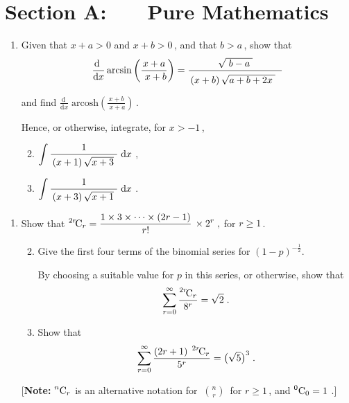 \documentclass[a4, 11pt]{report}
\newlength{\qspace}
\newcounter{qnumber}
\newenvironment{question}%
 {\vspace{\qspace}
  \begin{enumerate}[\bfseries 1\quad][10]%
    \setcounter{enumi}{\value{qnumber}}%
    \item%
 }
{
  \end{enumerate}
  \filbreak
  \stepcounter{qnumber}
 }
\newenvironment{questionparts}[1][1]%
 {
  \begin{enumerate}[\bfseries (i)]%
    \setcounter{enumii}{#1}
    \addtocounter{enumii}{-1}
    \setlength{\itemsep}{5mm}
    \setlength{\parskip}{8pt}
 }
 {
  \end{enumerate}
 }
\def\d{{\mathrm d}}
\def\A{{\mathrm A}}
\def\ge{\geqslant}
\newcommand{\ds}{\displaystyle}
\def\l{\left(}
\def\r{\right)}
\begin{document}
\setcounter{page}{2}

 
\section*{Section A: \ \ \ Pure Mathematics}

\begin{question}
Given that $x+a>0$ and $x+b>0\,$, and that $b>a\,$, show that   
\[  
\frac{\mathrm{d} \ }{\mathrm{d} x}   
\arcsin \l \frac{x + a }{ \ x + b} \r =   
\frac{ \sqrt{\;b - a\;}} {\vphantom{\Big(} \l x + b \r \sqrt{ a + b + 2x\;} \ \ }  
\]  
and find $\displaystyle   
\frac{\mathrm{d} \ }{  \mathrm{d} x} \;  \mathrm{arcosh} \l \frac{x + b }{ \ x + a} \r \,$.  
  
Hence, or otherwise, integrate, for $x > -1\,$,  
\begin{questionparts}  
\item $\displaystyle \int
\frac{1}{ \vphantom{\dot (}\l x + 1 \r \sqrt{x + 3} \ } \; \mathrm{d} x\;$,  
\item $\displaystyle \int
\frac{1} {\vphantom{\dot (}\l x + 3 \r \sqrt{x + 1} \ } \; \mathrm{d} x\;$.  
\end{questionparts}  
  
\noindent[You may use the results \  
$\ds \frac{\d \ }{\d x} \arcsin x = \frac 1 {\sqrt{1-x^2\;}\;}$  
\ and \   
$\ds \frac{\d \ }{\d x} \; {\rm arcosh } \; x = \frac 1 {\sqrt{x^2-1}\;}\;$. \ ]  
\end{question}

\begin{question}
 Show that 
 $\ds   
 ^{2r} \! {\rm C}_r =\frac{1\times3\times\dots\times (2r-1)}{r!} \, \times 2^r
 \;,
 $
 for $r\ge1\,$.
 
 \begin{questionparts}  
 \item Give  the first four terms of the binomial series for 
 $\l 1 - p \r^{-\frac12}$.  
  
 By choosing a suitable value for $p$ in this series, or otherwise, show that 
 $$
 \displaystyle \sum_{r=0}^\infty \frac{  {\vphantom {\A}}^{2r} \! {\rm C}_r }{ 8^r} = \sqrt 2
 \;
 .$$  
  
 \item Show that 
 $$
 \displaystyle 
 \sum_{r=0}^\infty   
 \frac{\l 2r + 1 \r \; {\vphantom{A}}^{2r} \! {\rm C} _r }{ 5^r} =\big( \sqrt 5\big)^3
 \;.
 $$ 
 \end{questionparts}  
  
 [{\bf Note: } 
 $
 {\vphantom{A}}^n {\rm C}_r
 $ 
 is an alternative notation for  
 $\ds \
 \binom n r 
 \,
 $ for $r\ge1\,$, and $
 {\vphantom{A}}^0 {\rm C}_0 =1
 $ .]
\end{question}
\end{document}
